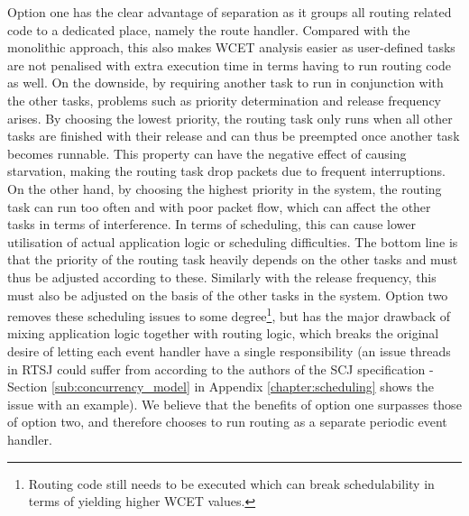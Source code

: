 Option one has the clear advantage of separation as it groups all routing related code to a dedicated place, namely the route handler. Compared with the monolithic approach, this also makes WCET analysis easier as user-defined tasks are not penalised with extra execution time in terms having to run routing code as well. On the downside, by requiring another task to run in conjunction with the other tasks, problems such as priority determination and release frequency arises. By choosing the lowest priority, the routing task only runs when all other tasks are finished with their release and can thus be preempted once another task becomes runnable. This property can have the negative effect of causing starvation, making the routing task drop packets due to frequent interruptions. On the other hand, by choosing the highest priority in the system, the routing task can run too often and with poor packet flow, which can affect the other tasks in terms of interference. In terms of scheduling, this can cause lower utilisation of actual application logic or scheduling difficulties. The bottom line is that the priority of the routing task heavily depends on the other tasks and must thus be adjusted according to these. Similarly with the release frequency, this must also be adjusted on the basis of the other tasks in the system. Option two removes these scheduling issues to some degree\footnote{Routing code still needs to be executed which can break schedulability in terms of yielding higher WCET values.}, but has the major drawback of mixing application logic together with routing logic, which breaks the original desire of letting each event handler have a single responsibility (an issue threads in RTSJ could suffer from according to the authors of the SCJ specification - Section \ref{sub:concurrency_model} in Appendix \ref{chapter:scheduling} shows the issue with an example). We believe that the benefits of option one surpasses those of option two, and therefore chooses to run routing as a separate periodic event handler.
